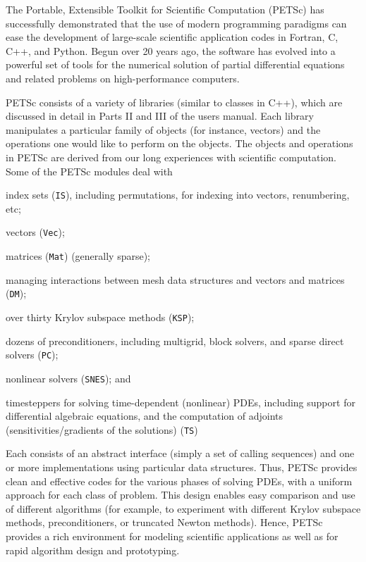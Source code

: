 
%
%
%

\label{sec_gettingstarted}

The Portable, Extensible Toolkit for Scientific Computation (PETSc)
has successfully demonstrated that the use of modern programming
paradigms can ease the development of large-scale scientific
application codes in Fortran, C, C++, and Python.  Begun over 20 years ago,
the software has evolved into a powerful set of tools for the
numerical solution of partial differential equations and related problems
on high-performance computers. 

PETSc consists of a variety of libraries (similar to classes in C++),
which are discussed in detail in Parts II and III of the users manual.
Each library manipulates a particular family of objects (for instance,
vectors) and the operations one would like to perform on the objects.
The objects and operations in PETSc are derived from our long
experiences with scientific computation. Some of the PETSc modules deal with
\begin{tightitemize}
  \item index sets (\lstinline{IS}), including permutations, for indexing into vectors, renumbering, etc;
  \item vectors (\lstinline{Vec});
  \item matrices (\lstinline{Mat}) (generally sparse);
  \item managing interactions between mesh data structures and vectors and matrices (\lstinline{DM});
  \item over thirty Krylov subspace methods (\lstinline{KSP});
  \item dozens of preconditioners, including multigrid, block solvers, and sparse direct solvers (\lstinline{PC});
  \item nonlinear solvers (\lstinline{SNES}); and
  \item timesteppers for solving time-dependent (nonlinear) PDEs, including support for differential algebraic equations, and the computation of adjoints (sensitivities/gradients of the solutions) (\lstinline{TS})
\end{tightitemize}
Each consists of an abstract interface
(simply a set of calling sequences) and one or more implementations
using particular data structures. Thus, PETSc provides clean and
effective codes for the various phases of solving PDEs, with a uniform
approach for each class of problem.  This design
enables easy comparison and use of different algorithms (for example,
to experiment with different Krylov subspace methods, preconditioners,
or truncated Newton methods).
Hence, PETSc provides a rich environment for modeling scientific
applications as well as for rapid algorithm design and prototyping.

